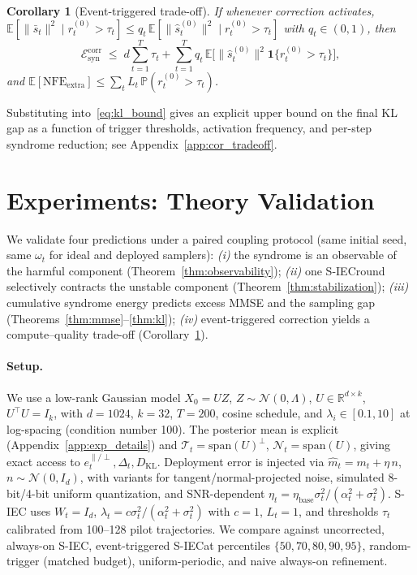 \documentclass{article}
\theoremstyle{plain}
\newtheorem{corollary}[theorem]{Corollary}
\theoremstyle{definition}
\theoremstyle{remark}
\newcommand{\SIEC}{\texorpdfstring{S\mbox{-}IEC\xspace}{S-IEC }}
\begin{document}
\begin{corollary}[Event-triggered trade-off]\label{cor:tradeoff}
If whenever correction activates,
\(\mathbb{E}[\|\bar s_t\|^2 \mid r_t^{(0)} > \tau_t] \le q_t\,\mathbb{E}[\|\hat
s_t^{(0)}\|^2 \mid r_t^{(0)} > \tau_t]\) with \(q_t\in(0,1)\), then
\begin{equation}
\mathcal{E}^{\mathrm{corr}}_{\mathrm{syn}} \;\le\;
d\sum_{t=1}^T \tau_t
+ \sum_{t=1}^T q_t\,\mathbb{E}\bigl[\|\hat s_t^{(0)}\|^2
  \mathbf{1}\{r_t^{(0)}>\tau_t\}\bigr],
\label{eq:triggered_energy}
\end{equation}
and \(\mathbb{E}[\mathrm{NFE}_{\mathrm{extra}}] \le
\sum_t L_t\,\mathbb{P}(r_t^{(0)} > \tau_t)\).
\end{corollary}

Substituting into~\eqref{eq:kl_bound} gives an explicit upper bound on the
final KL gap as a function of trigger thresholds, activation frequency, and
per-step syndrome reduction; see Appendix~\ref{app:cor_tradeoff}.

\section{Experiments: Theory Validation}
\label{sec:experiments}

We validate four predictions under a paired coupling protocol (same initial
seed, same \(\omega_t\) for ideal and deployed samplers): \emph{(i)} the
syndrome is an observable of the harmful component
(Theorem~\ref{thm:observability}); \emph{(ii)} one \SIEC round selectively
contracts the unstable component (Theorem~\ref{thm:stabilization});
\emph{(iii)} cumulative syndrome energy predicts excess MMSE and the
sampling gap (Theorems~\ref{thm:mmse}--\ref{thm:kl}); \emph{(iv)}
event-triggered correction yields a compute--quality trade-off
(Corollary~\ref{cor:tradeoff}).

\paragraph{Setup.}
We use a low-rank Gaussian model \(X_0 = U Z\), \(Z \sim \mathcal{N}(0,\Lambda)\),
\(U \in \mathbb{R}^{d\times k}\), \(U^\top U = I_k\), with \(d=1024\),
\(k=32\), \(T=200\), cosine schedule, and \(\lambda_i \in [0.1,10]\) at
log-spacing (condition number 100). The posterior mean is explicit
(Appendix~\ref{app:exp_details}) and
\(\mathcal{T}_t = \mathrm{span}(U)^\perp\), \(\mathcal{N}_t = \mathrm{span}(U)\),
giving exact access to \(e_t^{\parallel/\perp}, \Delta_t, D_{\mathrm{KL}}\).
Deployment error is injected via \(\hat m_t = m_t + \eta\, n\),
\(n\sim\mathcal{N}(0,I_d)\), with variants for tangent/normal-projected
noise, simulated 8-bit/4-bit uniform quantization, and SNR-dependent
\(\eta_t = \eta_{\mathrm{base}}\sigma_t^2/(\alpha_t^2+\sigma_t^2)\). \SIEC
uses \(W_t=I_d\), \(\lambda_t = c\sigma_t^2/(\alpha_t^2+\sigma_t^2)\) with
\(c=1\), \(L_t=1\), and thresholds \(\tau_t\) calibrated from 100--128 pilot
trajectories. We compare against uncorrected, always-on \SIEC,
event-triggered \SIEC at percentiles \(\{50,70,80,90,95\}\), random-trigger
(matched budget), uniform-periodic, and naive always-on refinement.
\end{document}
